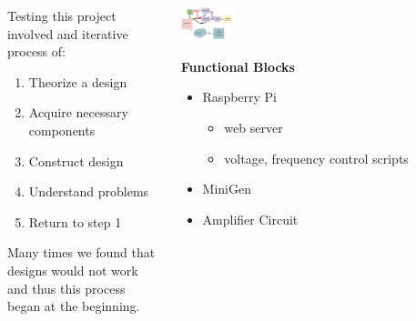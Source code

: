 \documentclass[25pt, a0paper, portrait, margin=0mm, innermargin=15mm, blockverticalspace=15mm, colspace=15mm, subcolspace=8mm]{tikzposter}
\begin{document}
\begin{columns}
{\begin{multicols}{2}
Testing this project involved
and iterative process of:
\begin{enumerate}
\item Theorize a design
\item Acquire necessary components
\item Construct design
\item Understand problems
\item Return to step 1
\end{enumerate}
Many times we found that designs would not work
and thus this process began at the beginning.

\end{multicols}
}


%
%

{
\begin{multicols}{2}

\begin{center}
\includegraphics[width=0.2\textwidth,keepaspectratio]{block_diagram.pdf}
\end{center}

\textbf{Functional Blocks}
\begin{itemize}
\item Raspberry Pi
  \begin{itemize}
  \item web server
  \item voltage, frequency control scripts
  \end{itemize}
\item MiniGen
\item Amplifier Circuit
\end{itemize}

\end{multicols}
}


%
%
{
\begin{multicols}{2}


\end{multicols}}
\end{columns}
\end{document}
